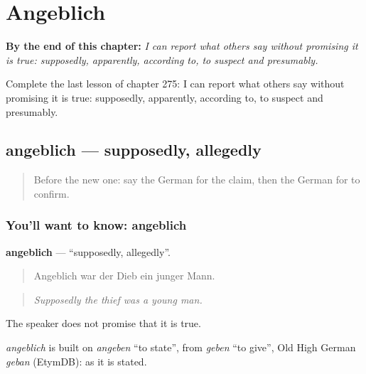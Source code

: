 
\chapter{Angeblich}
\label{ch:ge-angeblich}

\begin{chapteropening}
\textbf{By the end of this chapter:} \emph{I can report what others say without promising it is true: supposedly, apparently, according to, to suspect and presumably.}

Complete the last lesson of chapter 275: I can report what others say without promising it is true: supposedly, apparently, according to, to suspect and presumably.
\end{chapteropening}

\section[angeblich]{angeblich — supposedly, allegedly}

\label{lesson:GE-C275-angeblich}



\begin{quote}
Before the new one: say the German for the claim, then the German for to confirm.
\end{quote}

\subsection*{You'll want to know: angeblich}
\textbf{angeblich} — \textquotedblleft{}supposedly, allegedly\textquotedblright{}.

\begin{quote}
Angeblich war der Dieb ein junger Mann.
\end{quote}

\begin{quote}
\emph{Supposedly the thief was a young man.}
\end{quote}

The speaker does not promise that it is true.

\begin{cousinweb}
\emph{angeblich} is built on \emph{angeben} \textquotedblleft{}to state\textquotedblright{}, from \emph{geben} \textquotedblleft{}to give\textquotedblright{}, Old High German \emph{geban} (EtymDB): as it is stated.
\end{cousinweb}

